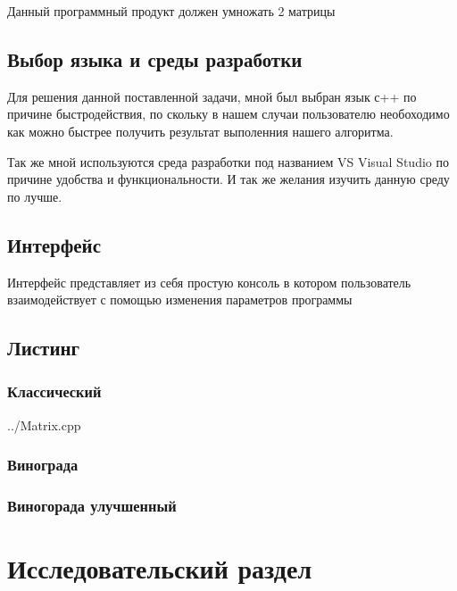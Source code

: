 \documentclass[a4paper, 14pt]{article}
\begin{document}
	Данный программный продукт должен умножать 2 матрицы
	
	
	\subsection{Выбор языка и среды разработки}
	
	Для решения данной поставленной задачи, мной был выбран язык с++ по причине быстродействия, по скольку в нашем случаи пользователю необоходимо как можно быстрее получить результат выполенния нашего алгоритма.
	
	Так же мной используются среда разработки под названием VS Visual Studio по причине удобства и функциональности. И так же желания изучить данную среду по лучше.
	
	\subsection{Интерфейс}
	
	Интерфейс представляет из себя простую консоль в котором пользователь взаимодействует с помощью изменения параметров программы
	
	\subsection{Листинг}
	
	\subsubsection{Классический}
		
	 {../Matrix.cpp}
	
	\subsubsection{Винограда}
	
	
	
	\subsubsection{Виногорада улучшенный}
	
	
		
	\newpage
	\section{Исследовательский раздел}
	
\end{document}
